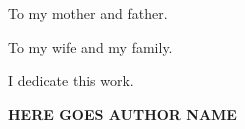 To my mother and father.

To my wife and my family.

\begin{center}
I dedicate this work.
\end{center}

\vspace{24pt}
{\hfill\bfseries HERE GOES AUTHOR NAME\par}
